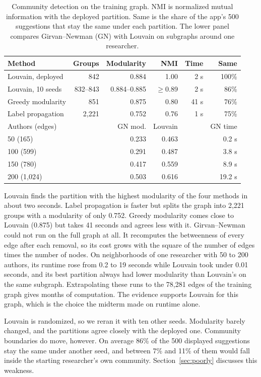 \documentclass[sigconf,nonacm]{acmart}
\begin{document}
\begin{table}[t]
\caption{Community detection on the training graph. NMI is normalized mutual information with the deployed partition. Same is the share of the app's 500 suggestions that stay the same under each partition. The lower panel compares Girvan--Newman (GN) with Louvain on subgraphs around one researcher.}
\label{tab:communities}
\small
\setlength{\tabcolsep}{2.6pt}
\begin{tabular*}{\columnwidth}{@{\extracolsep{\fill}}lrrrrr@{}}
\toprule
Method & Groups & Modularity & NMI & Time & Same\\
\midrule
Louvain, deployed & 842 & 0.884 & 1.00 & 2 s & 100\%\\
Louvain, 10 seeds & 832--843 & 0.884--0.885 & $\geq$0.89 & 2 s & 86\%\\
Greedy modularity & 851 & 0.875 & 0.80 & 41 s & 76\%\\
Label propagation & 2,221 & 0.752 & 0.76 & 1 s & 75\%\\
\midrule
Authors (edges) & & GN mod. & Louvain & & GN time\\
\midrule
50 (165) & & 0.233 & 0.463 & & 0.2 s\\
100 (599) & & 0.291 & 0.487 & & 3.8 s\\
150 (780) & & 0.417 & 0.559 & & 8.9 s\\
200 (1,024) & & 0.503 & 0.616 & & 19.2 s\\
\bottomrule
\end{tabular*}
\end{table}

Louvain finds the partition with the highest modularity of the four methods in about two seconds. Label propagation is faster but splits the graph into 2,221 groups with a modularity of only 0.752. Greedy modularity comes close to Louvain (0.875) but takes 41 seconds and agrees less with it. Girvan--Newman could not run on the full graph at all. It recomputes the betweenness of every edge after each removal, so its cost grows with the square of the number of edges times the number of nodes. On neighborhoods of one researcher with 50 to 200 authors, its runtime rose from 0.2 to 19 seconds while Louvain took under 0.01 seconds, and its best partition always had lower modularity than Louvain's on the same subgraph. Extrapolating these runs to the 78,281 edges of the training graph gives months of computation. The evidence supports Louvain for this graph, which is the choice the midterm made on runtime alone.

Louvain is randomized, so we reran it with ten other seeds. Modularity barely changed, and the partitions agree closely with the deployed one. Community boundaries do move, however. On average 86\% of the 500 displayed suggestions stay the same under another seed, and between 7\% and 11\% of them would fall inside the starting researcher's own community. Section~\ref{sec:poorly} discusses this weakness.
\end{document}
